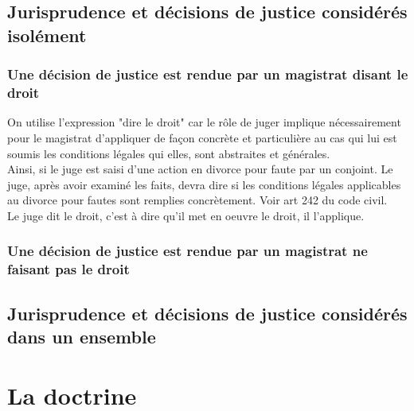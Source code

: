 \documentclass[12pt, a4paper, openany]{book}
\begin{document}
\section{Jurisprudence et décisions de justice considérés isolément}

\subsection{Une décision de justice est rendue par un magistrat disant le droit}

On utilise l'expression "dire le droit" car le rôle de juger implique nécessairement pour le magistrat d'appliquer de façon concrète et particulière au cas qui lui est soumis les conditions légales qui elles, sont abstraites et générales. \\
Ainsi, si le juge est saisi d'une action en divorce pour faute par un conjoint. Le juge, après avoir examiné les faits, devra dire si les conditions légales applicables au divorce pour fautes sont remplies concrètement. Voir art 242 du code civil. \\
Le juge dit le droit, c'est à dire qu'il met en oeuvre le droit, il l'applique.



\subsection{Une décision de justice est rendue par un magistrat ne faisant pas le droit}




\section{Jurisprudence et décisions de justice considérés dans un ensemble}







\chapter{La doctrine}
\end{document}
